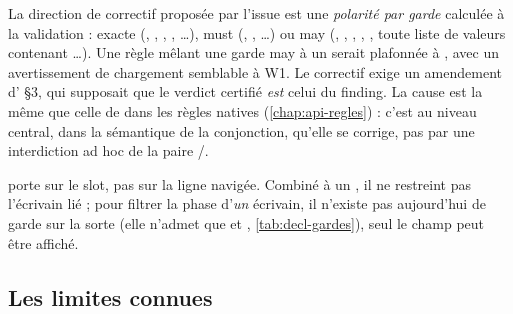 La direction de correctif proposée par l'issue est une \emph{polarité par garde} calculée à la validation : exacte (, , , , \ldots), must (, , \ldots) ou may (, , , , , toute liste de valeurs contenant \ldots). Une règle mêlant une garde may à un  serait plafonnée à \Warning{}, avec un avertissement de chargement semblable à W1. Le correctif exige un amendement d' §3, qui supposait que le verdict certifié \emph{est} celui du finding. La cause est la même que celle de  dans les règles natives (\cref{chap:api-regles}) : c'est au niveau central, dans la sémantique de la conjonction, qu'elle se corrige, pas par une interdiction ad hoc de la paire /.

\begin{piege}
 porte sur le slot, pas sur la ligne navigée. Combiné à un , il ne restreint pas l'écrivain lié ; pour filtrer la phase d'\emph{un} écrivain, il n'existe pas aujourd'hui de garde  sur la sorte  (elle n'admet que  et , \cref{tab:decl-gardes}), seul le champ  peut être affiché.
\end{piege}

\subsection{Les limites connues}


